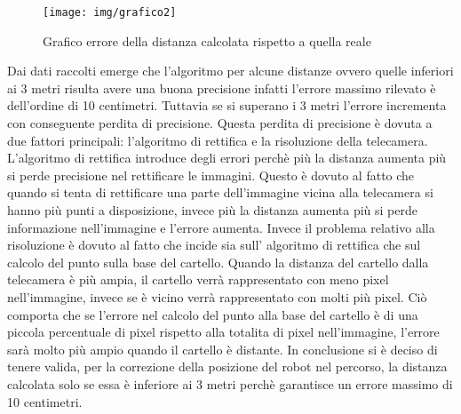 	\begin{figure}[!ht]
		\centering
		\texttt{[image: img/grafico2]}
		\caption[Grafico errore calolo distanza]{Grafico errore della distanza calcolata rispetto a quella reale }
	\end{figure}

	Dai dati raccolti emerge che l'algoritmo per alcune distanze ovvero quelle inferiori ai 3 metri risulta avere una buona precisione infatti l'errore massimo rilevato è dell'ordine di 10 centimetri. Tuttavia se si superano i 3 metri l'errore incrementa con conseguente perdita di precisione. Questa perdita di precisione è dovuta a due fattori principali: l'algoritmo di rettifica e la risoluzione della telecamera. L'algoritmo di rettifica introduce degli errori perchè più la distanza aumenta più si perde precisione nel rettificare le immagini. Questo è dovuto al fatto che quando si tenta di rettificare una parte dell'immagine vicina alla telecamera si hanno più punti a disposizione, invece più la distanza aumenta più si perde informazione nell'immagine e l'errore aumenta. Invece il problema relativo alla risoluzione è dovuto al fatto che incide sia sull' algoritmo di rettifica che sul calcolo del punto sulla base del cartello. Quando la distanza del cartello dalla telecamera è più ampia, il cartello verrà rappresentato con meno pixel nell'immagine, invece se è vicino verrà rappresentato con molti più pixel. Ciò comporta che se l'errore nel calcolo del punto alla base del cartello è di una piccola percentuale di pixel rispetto alla totalita di pixel nell'immagine, l'errore sarà molto più ampio quando il cartello è distante. In conclusione si è deciso di tenere valida, per la correzione della posizione del robot nel percorso, la distanza calcolata solo se essa è inferiore ai 3 metri perchè garantisce un errore massimo di 10 centimetri. 





